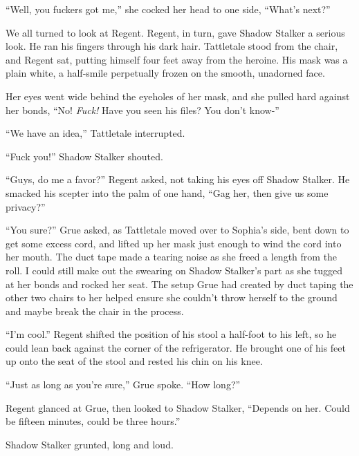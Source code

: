 ``Well, you fuckers got me,'' she cocked her head to one side, ``What's next?''



We all turned to look at Regent.  Regent, in turn, gave Shadow Stalker a serious look.  He ran his fingers through his dark hair.  Tattletale stood from the chair, and Regent sat, putting himself four feet away from the heroine.  His mask was a plain white, a half-smile perpetually frozen on the smooth, unadorned face.



Her eyes went wide behind the eyeholes of her mask, and she pulled hard against her bonds, ``No!  \emph{Fuck!}  Have you seen his files?  You don't know-''



``We have an idea,'' Tattletale interrupted.



``Fuck you!''  Shadow Stalker shouted.



``Guys, do me a favor?'' Regent asked, not taking his eyes off Shadow Stalker.  He smacked his scepter into the palm of one hand, ``Gag her, then give us some privacy?''



``You sure?'' Grue asked, as Tattletale moved over to Sophia's side, bent down to get some excess cord, and lifted up her mask just enough to wind the cord into her mouth.  The duct tape made a tearing noise as she freed a length from the roll.  I could still make out the swearing on Shadow Stalker's part as she tugged at her bonds and rocked her seat.  The setup Grue had created by duct taping the other two chairs to her helped ensure she couldn't throw herself to the ground and maybe break the chair in the process.



``I'm cool.''  Regent shifted the position of his stool a half-foot to his left, so he could lean back against the corner of the refrigerator.  He brought one of his feet up onto the seat of the stool and rested his chin on his knee.



``Just as long as you're sure,'' Grue spoke.  ``How long?''



Regent glanced at Grue, then looked to Shadow Stalker, ``Depends on her.  Could be fifteen minutes, could be three hours.''



Shadow Stalker grunted, long and loud.



